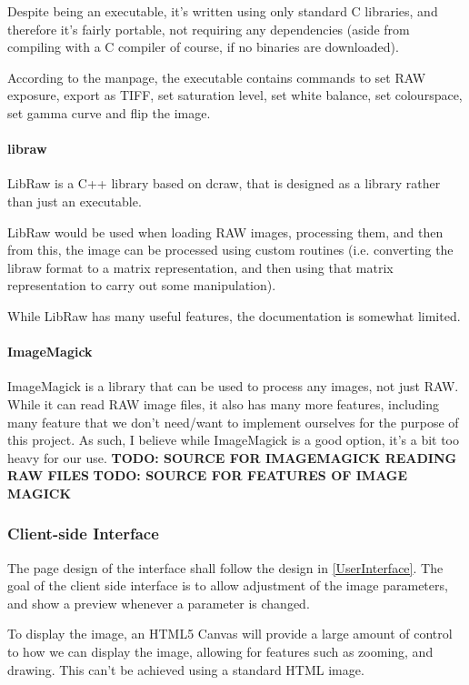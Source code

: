 \documentclass[12pt,a4paper]{article}
\begin{document}
Despite being an executable, it's written using only standard C libraries, and therefore it's
fairly portable, not requiring any dependencies (aside from compiling with a C compiler of course, if
no binaries are downloaded). \cite{DcrawWebsite}

According to the manpage, the executable contains commands to set RAW exposure, export as TIFF,
set saturation level, set white balance, set colourspace, set gamma curve and flip the image. \cite{DcrawManpage}


\paragraph{libraw}
LibRaw is a C++ library based on dcraw, that is designed as a library rather than just
an executable.

LibRaw would be used when loading RAW images, processing them, and then from this,
the image can be processed using custom routines (i.e. converting the libraw format
to a matrix representation, and then using that matrix representation to carry out
some manipulation).

While LibRaw has many useful features, the documentation is somewhat limited.

\paragraph{ImageMagick}
ImageMagick is a library that can be used to process any images, not just RAW. While it can read
RAW image files, it also has many more features, including many feature that we don't need/want to
implement ourselves for the purpose of this project. As such, I believe while ImageMagick is a good option,
it's a bit too heavy for our use.
\textbf{TODO: SOURCE FOR IMAGEMAGICK READING RAW FILES}
\textbf{TODO: SOURCE FOR FEATURES OF IMAGE MAGICK}

\subsubsection{Client-side Interface}
  The page design of the interface shall follow the design in \ref{UserInterface}.
  The goal of the client side interface is to allow adjustment of the image parameters,
  and show a preview whenever a parameter is changed.

  To display the image, an HTML5 Canvas will provide a large amount of control to
  how we can display the image, allowing for features such as zooming, and drawing. This can't be
  achieved using a standard HTML image.
\end{document}
